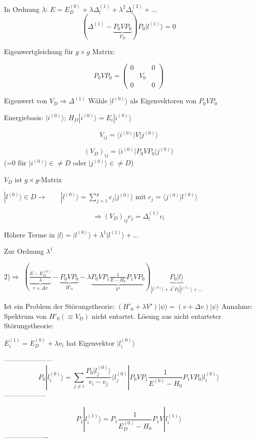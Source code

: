In Ordnung \(\lambda\): \(E=E^{(0)}_D+\lambda\Delta^{(1)}_l + \lambda^2\Delta^{(2)}_l+...\)
\[ (\Delta^{(1)}-\underbrace{P_0VP_0}_{V_D})P_0|l^{(1)}\rangle = 0\]

Eigenwertgleichung für \(g\times g\) Matrix:

\[ P_0 V P_0 = \begin{pmatrix} 0&&0\\ &V_0&\\0&&0 \end{pmatrix} \]

Eigenwert von \(V_D \Rightarrow \Delta^{(1)}\) Wähle \(|l^{(0)}\rangle\) als Eigenvektoren von \(P_0VP_0\)

Energiebasis: \(|i^{(0)}\rangle\); \(H_D|i^{(0)}\rangle=E_i|i^{(0)}\rangle\)

\[ V_{ij} = \langle  i^{(0)}|V|j^{(0)}\rangle \]

\[ (V_D)_{ij} = \langle  i^{(0)}|P_0VP_0|j^{(0)}\rangle \]
(=0 für \(|i^{(0)}\rangle \in\neq D \) oder \(|j^{(0)}\rangle \in\neq D \))

\(V_D\) ist \(g\times g\)-Matrix

\(|l^{(0)}\rangle \in D \rightarrow \qquad |l^{(0)}\rangle=\sum^g_{j=1}c_j|j^{(0)}\rangle \) mit \(c_j=\langle j^{(0)}|l^{(0)}\rangle\)

\[\Rightarrow (V_D)_{ij} c_j = \Delta^{(1)}_l c_i\]

Höhere Terme in \(|l\rangle=|l^{(0)}\rangle+\lambda^1|l^{(1)}\rangle+...\)

Zur Ordnung \(\lambda^1\)

2)\(\Rightarrow\) \((\underbrace{\frac{E-E^{(0)}_D}{\lambda}}_{v+\Delta v}-\underbrace{P_0VP_0}_{H'_0}-\lambda \underbrace{P_0VP_1 \frac{1}{E-H_0}P_1VP_0}_{V'})\underbrace{P_0|l\rangle}_{|l^{(0)}\rangle+\lambda^1P_0|l^{(1)}\rangle+...}\)

Ist ein Problem der Störungstheorie: \((H'_0+\lambda V')|\psi\rangle = (v+\Delta v)|\psi\rangle\) Annahme: Spektrum von \(H'_0(\equiv V_D)\) nicht entartet. Lösung aus nicht entarteter Störungstheorie:

\( E^{(1)}_i = E^{(0)}_D + \lambda v_i\) hat Eigenvektor \(|l^{(0)}_i\rangle\)

---------------------
\[P_0|l^{(0)}_i\rangle = \sum_{j\neq i}\frac{P_0|l^{(0)}_j\rangle}{v_i - v_j}\langle l^{(0)}_j|P_0VP_1\frac{1}{E^{(0)}-H_0}P_1VP_0 |l^{(0)}_i\rangle\]
------------------

\[P_1|l^{(1)}_i\rangle = P_1 \frac{1}{E^{(0)}_D-H_0}P_1 V |l^{(1)}_i\rangle\]
-------------------

